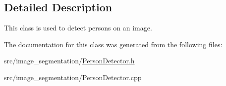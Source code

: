 \subsection{Detailed Description}
This class is used to detect persons on an image. 

The documentation for this class was generated from the following files\+:\begin{DoxyCompactItemize}
\item 
src/image\+\_\+segmentation/\mbox{\hyperlink{_person_detector_8h}{Person\+Detector.\+h}}\item 
src/image\+\_\+segmentation/Person\+Detector.\+cpp\end{DoxyCompactItemize}
